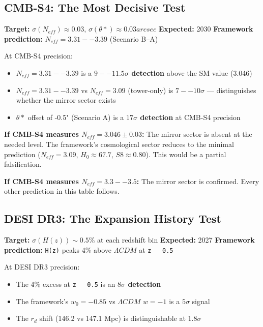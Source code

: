 \documentclass[aps,prd,preprint,superscriptaddress,longbibliography]{revtex4-2}
\begin{document}
\subsection{CMB-S4: The Most Decisive Test}

\textbf{Target:} $\sigma(N_{eff}) \approx 0.03$, $\sigma(\theta*) \approx 0.03 arcsec$ \textbf{Expected:} 2030 \textbf{Framework prediction:} $N_{eff} = 3.31--3.39$ (Scenario B--A)

At CMB-S4 precision:

\begin{itemize}
  \item $N_{eff} = 3.31--3.39$ is a \textbf{$9--11.5\sigma$ detection} above the SM value (3.046)
  \item $N_{eff} = 3.31--3.39$ vs $N_{eff} = 3.09$ (tower-only) is \textbf{$7--10\sigma$} --- distinguishes whether the mirror sector exists
  \item $\theta*$ offset of -0.5" (Scenario A) is a \textbf{$17\sigma$ detection} at CMB-S4 precision
\end{itemize}

\textbf{If CMB-S4 measures $N_{eff} = 3.046 \pm 0.03$:} The mirror sector is absent at the needed level. The framework's cosmological sector reduces to the minimal prediction ($N_{eff} = 3.09$, $H_{0} \approx 67.7$, $S8 \approx 0.80$). This would be a partial falsification.

\textbf{If CMB-S4 measures $N_{eff} = 3.3--3.5$:} The mirror sector is confirmed. Every other prediction in this table follows.



\subsection{DESI DR3: The Expansion History Test}

\textbf{Target:} $\sigma(H(z)) \sim  0.5\%$ at each redshift bin \textbf{Expected:} 2027 \textbf{Framework prediction:} \texttt{H(z)} peaks 4\% above $\Lambda CDM$ at \texttt{z ~ 0.5}

At DESI DR3 precision:

\begin{itemize}
  \item The 4\% excess at \texttt{z ~ 0.5} is an \textbf{$8\sigma$ detection}
  \item The framework's $w_{0} = -0.85$ vs $\Lambda CDM$ $w = -1$ is a \textbf{$5\sigma$} signal
  \item The $r_d$ shift (146.2 vs 147.1 Mpc) is distinguishable at \textbf{$1.8\sigma$}
\end{itemize}
\end{document}
